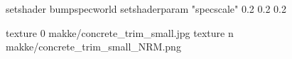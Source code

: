 setshader bumpspecworld
setshaderparam "specscale" 0.2 0.2 0.2

texture 0 makke/concrete_trim_small.jpg
texture n makke/concrete_trim_small_NRM.png
